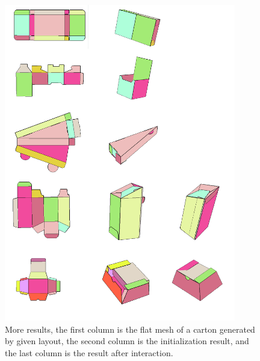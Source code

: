 \begin{figure}
	\centering
	\includegraphics[width=0.9\textwidth]{images/more.jpg}
	\caption{More results, the first column is the flat mesh of a carton generated by given layout, the second column is the initialization result, and the last column is the result after interaction.}
	\label{fig:more}
\end{figure}